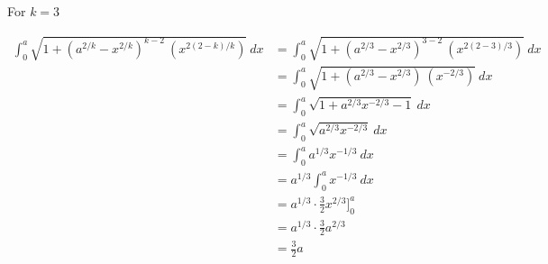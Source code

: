 \documentclass[9pt]{article}
\begin{document}
For $k = 3$

\begin{align*}
  \int_{0}^{a} \sqrt{1 + (a^{2/k} - x^{2/k})^{k - 2} \ (x^{2(2 - k)/k})} \ dx &= \int_{0}^{a} \sqrt{1 + (a^{2/3} - x^{2/3})^{3 - 2} \ (x^{2(2 - 3)/3})} \ dx \\
  &= \int_{0}^{a} \sqrt{1 + (a^{2/3} - x^{2/3}) \ (x^{-2/3})} \ dx \\
  &= \int_{0}^{a} \sqrt{1 + a^{2/3}x^{-2/3} - 1} \ dx \\
  &= \int_{0}^{a} \sqrt{a^{2/3}x^{-2/3}} \ dx \\
  &= \int_{0}^{a} a^{1/3}x^{-1/3} \ dx \\
  &= a^{1/3} \int_{0}^{a} x^{-1/3} \ dx \\
  &= a^{1/3} \cdot \frac{3}{2} x^{2/3} \bigg]_{0}^{a} \\
  &= a^{1/3} \cdot \frac{3}{2} a^{2/3} \\
  &= \frac{3}{2} a
\end{align*}
\end{document}
